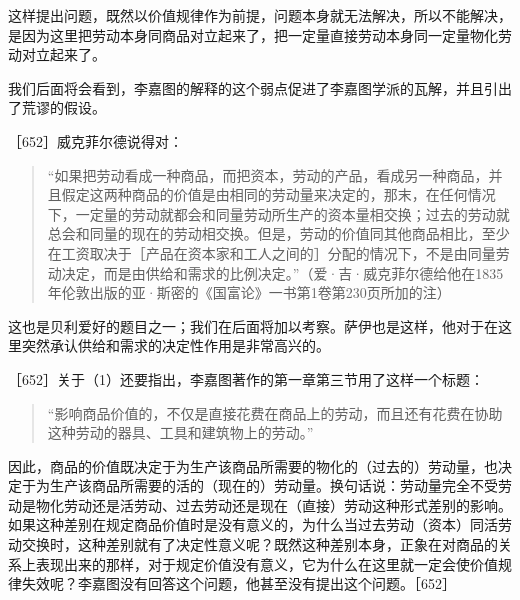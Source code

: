 这样提出问题，既然以价值规律作为前提，问题本身就无法解决，所以不能解决，是因为这里把劳动本身同商品对立起来了，把一定量直接劳动本身同一定量物化劳动对立起来了。

我们后面将会看到，李嘉图的解释的这个弱点促进了李嘉图学派的瓦解，并且引出了荒谬的假设。

［652］威克菲尔德说得对：

\begin{quote}{“如果把劳动看成一种商品，而把资本，劳动的产品，看成另一种商品，并且假定这两种商品的价值是由相同的劳动量来决定的，那末，在任何情况下，一定量的劳动就都会和同量劳动所生产的资本量相交换；过去的劳动就总会和同量的现在的劳动相交换。但是，劳动的价值同其他商品相比，至少在工资取决于［产品在资本家和工人之间的］分配的情况下，不是由同量劳动决定，而是由供给和需求的比例决定。”（爱·吉·威克菲尔德给他在1835年伦敦出版的亚·斯密的《国富论》一书第1卷第230页所加的注）}\end{quote}

这也是贝利爱好的题目之一；我们在后面将加以考察。萨伊也是这样，他对于在这里突然承认供给和需求的决定性作用是非常高兴的。


［652］关于（1）还要指出，李嘉图著作的第一章第三节用了这样一个标题：

\begin{quote}{“影响商品价值的，不仅是直接花费在商品上的劳动，而且还有花费在协助这种劳动的器具、工具和建筑物上的劳动。”}\end{quote}

因此，商品的价值既决定于为生产该商品所需要的物化的（过去的）劳动量，也决定于为生产该商品所需要的活的（现在的）劳动量。换句话说：劳动量完全不受劳动是物化劳动还是活劳动、过去劳动还是现在（直接）劳动这种形式差别的影响。如果这种差别在规定商品价值时是没有意义的，为什么当过去劳动（资本）同活劳动交换时，这种差别就有了决定性意义呢？既然这种差别本身，正象在对商品的关系上表现出来的那样，对于规定价值没有意义，它为什么在这里就一定会使价值规律失效呢？李嘉图没有回答这个问题，他甚至没有提出这个问题。［652］

